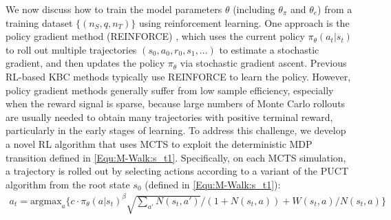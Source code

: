 \documentclass{article}
\newcommand{\argmax}{\mathrm{argmax}}
\newcommand{\modelname}{M-Walk}
\begin{document}
	
	We now discuss how to train the model parameters $\theta$ (including $\theta_{\pi}$ and $\theta_e$) from a training dataset $\{(n_S,q,n_T)\}$ using reinforcement learning. One approach is the policy gradient method (REINFORCE) \cite{williams1992simple,sutton2000policy}, which uses the current policy $\pi_{\theta}(a_t|s_t)$ to roll out multiple trajectories $(s_0, a_0, r_0, s_1,\ldots)$ to estimate a stochastic gradient, and then updates the policy $\pi_{\theta}$ via stochastic gradient ascent. Previous RL-based KBC methods \cite{DeepPath,GoforaWalk} typically use REINFORCE to learn the policy. However, policy gradient methods generally suffer from low sample efficiency, especially when the reward signal is sparse, because large numbers of Monte Carlo rollouts are usually needed to obtain many trajectories with positive terminal reward, particularly in the early stages of learning. To address this challenge, we develop a novel RL algorithm that uses MCTS to exploit the deterministic MDP transition defined in \eqref{Equ:\modelname:s_t1}. Specifically, on each MCTS simulation, a trajectory is rolled out by selecting actions according to a variant of the PUCT algorithm \cite{Rosin2011, silver2017mastering} from the root state $s_0$ (defined in \eqref{Equ:\modelname:s_t1}):
\begin{align}
        	a_t     =
        	            \argmax_a
        	            \Big\{ 
        	                c \cdot \pi_{\theta}(a | s_t)^{\beta}
        	                \sqrt{
        	                    \textstyle \sum_{a'} N(s_t, a')
        	                    }
        	                \big/
        	                (1 \!+\! N(s_t, a)) 
        	                \!+\! 
        	                W(s_t, a)/N(s_t, a)
        	            \Big\}	   	\label{Equ:\modelname:PUCT}
    	\end{align}
\end{document}
